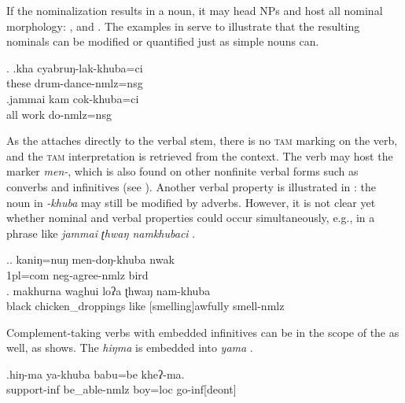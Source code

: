 \newpage	
If the nominalization results in a noun, it may head NPs and host all nominal morphology: ,  and . The examples in \Next serve to illustrate that the resulting nominals can be modified or quantified just as simple nouns can. 

\ex. \ag.kha cyabruŋ-lak-khuba=ci\\
	these drum-dance{\sc -nmlz=nsg}	\\
	 
 	\bg.jammai kam cok-khuba=ci\\
	all work do{\sc -nmlz=nsg}\\
	 	

	
As the  attaches directly to the verbal stem, there is no \textsc{tam} marking on the verb, and the \textsc{tam} interpretation is retrieved from the context. The verb may host the  marker \emph{men-}, which is also found on other nonfinite verbal forms such as converbs and infinitives (see \Next[a]). Another verbal property is illustrated in \Next: the noun in \emph{-khuba} may still be modified by adverbs. However, it is not clear yet whether nominal and verbal properties could occur simultaneously, e.g., in a phrase like \emph{jammai ʈhwaŋ namkhubaci} .
	
\ex.\ag. kaniŋ=nuŋ   men-doŋ-khuba     nwak\\
	{\sc 1pl=com} {\sc neg}-agree-{\sc nmlz} bird		\\ 
	 
\bg. makhurna waghui loʔa ʈhwaŋ nam-khuba\\
black chicken\_droppings like {[smelling]}awfully smell-{\sc nmlz}\\


Complement-taking verbs with embedded infinitives can be in the scope of the  as well, as \Next shows. The  \emph{hiŋma}  is embedded into \emph{yama} .
	
	\exg.hiŋ-ma   ya-khuba babu=be    kheʔ-ma.\\
	support{\sc -inf} be\_able{\sc -nmlz} boy{\sc =loc} go{\sc -inf[deont]}\\
	

